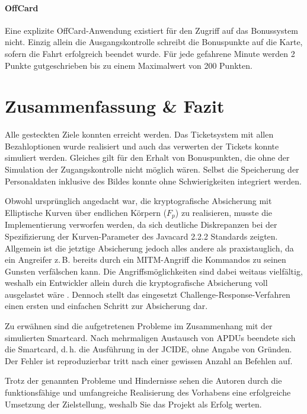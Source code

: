 \documentclass[	a4paper,
			11pt,
			oneside,
			parskip]{scrartcl}
\begin{document}
\paragraph{OffCard} Eine explizite OffCard-Anwendung existiert für den Zugriff auf das Bonussystem nicht. Einzig allein die Ausgangskontrolle schreibt die Bonuspunkte auf die Karte, sofern die Fahrt erfolgreich beendet wurde. Für jede gefahrene Minute werden 2 Punkte gutgeschrieben bis zu einem Maximalwert von 200 Punkten.
	
\section{Zusammenfassung \& Fazit}

Alle gesteckten Ziele konnten erreicht werden. Das Ticketsystem mit allen Bezahloptionen wurde realisiert und auch das verwerten der Tickets konnte simuliert werden. Gleiches gilt für den Erhalt von Bonuspunkten, die ohne der Simulation der Zugangskontrolle nicht möglich wären. Selbst die Speicherung der Personaldaten inklusive des Bildes konnte ohne Schwierigkeiten integriert werden.\medskip

Obwohl ursprünglich angedacht war, die kryptografische Absicherung mit Elliptische Kurven über endlichen Körpern ($F_p$) zu realisieren, musste die Implementierung verworfen werden, da sich deutliche Diskrepanzen bei der Spezifizierung der Kurven-Parameter des Javacard 2.2.2 Standards zeigten. Allgemein ist die jetztige Absicherung jedoch alles andere als praxistauglich, da ein Angreifer z.\,B. bereits durch ein MITM-Angriff die Kommandos zu seinen Gunsten verfälschen kann. Die Angriffsmöglichkeiten sind dabei weitaus vielfältig, weshalb ein Entwickler allein durch die kryptografische Absicherung voll ausgelastet wäre \cite{Markantonakis.2014}. Dennoch stellt das
eingesetzt Challenge-Response-Verfahren einen ersten und einfachen Schritt zur Absicherung dar.

Zu erwähnen sind die aufgetretenen Probleme im Zusammenhang mit der simulierten Smartcard. Nach mehrmaligen Austausch von APDUs beendete sich die Smartcard, d.\,h. die Ausführung in der JCIDE, ohne Angabe von Gründen. Der Fehler ist reproduzierbar tritt nach einer gewissen Anzahl an Befehlen auf.

Trotz der genannten Probleme und Hindernisse sehen die Autoren durch die funktionsfähige und umfangreiche Realisierung des Vorhabens eine erfolgreiche Umsetzung der Zielstellung, weshalb Sie das Projekt als Erfolg werten.

\clearpage
\printbibliography[heading=bibintoc]
\end{document}
